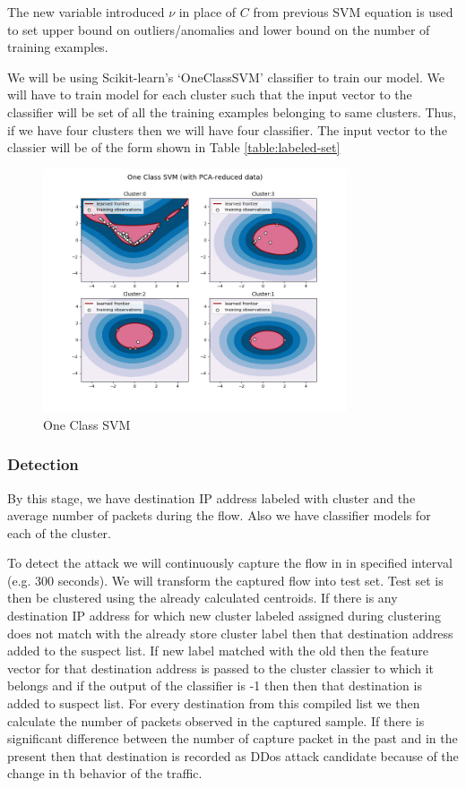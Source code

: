 \documentclass[10pt,oneside,a4paper]{article}
\begin{document}
The new variable introduced $\nu$ in place of $C$ from previous SVM equation is used to set upper bound on outliers/anomalies and lower bound on the number of training examples.

We will be using Scikit-learn's `OneClassSVM' classifier to train our model. We will have to train model for each cluster such that the input vector to the classifier will be set of all the training examples belonging to same clusters. Thus, if we have four clusters then we will have four classifier. The input vector to the classier will be of the form shown in Table \ref{table:labeled-set}

\begin{figure}[H]
\centering
\includegraphics[width=0.80\textwidth]{one-class-SVM}
\caption{One Class SVM} \label{fig:one-class-SVM}
\end{figure}


\subsubsection{Detection}

By this stage, we have destination IP address labeled with cluster and the average number of packets during the flow. Also we have classifier models for each of the cluster.

To detect the attack we will continuously capture the flow in in specified interval (e.g. 300 seconds). We will transform the captured flow into test set. Test set is then be clustered using the already calculated centroids. If there is any destination IP address for which new cluster labeled assigned during clustering does not match with the already store cluster label then that destination address added to the suspect list. If new label matched with the old then the feature vector for that destination address is passed to the cluster classier to which it belongs and if the output of the classifier is -1 then then that destination is added to suspect list. For every destination from this compiled list we then calculate the number of packets observed in the captured sample. If there is significant difference between the number of capture packet in the past and in the present then that destination is recorded as DDos attack candidate because of the change in th behavior of the traffic.
\end{document}
